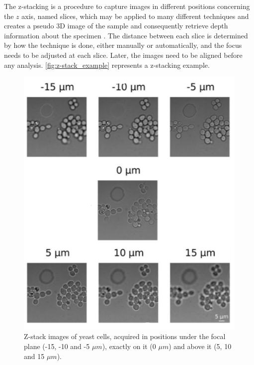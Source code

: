 The z-stacking is a procedure to capture images in different positions concerning the $z$ axis, named slices, which may be applied to many different techniques and creates a pseudo 3D image of the sample and consequently retrieve depth information about the specimen \cite{lawlor2019introduction}. The distance between each slice is determined by how the technique is done, either manually or automatically, and the focus needs to be adjusted at each slice. Later, the images need to be aligned before any analysis. \autoref{fig:z-stack_example} represents a z-stacking example.

\begin{figure}[H]
	\centering
	\caption{\label{fig:z-stack_example} Z-stack images of yeast cells, acquired in positions under the focal plane (-15, -10 and -5 $\mu m$), exactly on it (0 $\mu m$) and above it (5, 10 and 15 $\mu m$).}
	\begin{center}
	    \includegraphics[scale=0.5]{images/z-stack.png}
	\end{center}
	\centering
\end{figure}